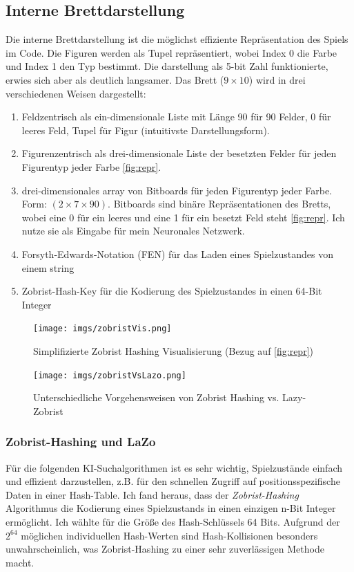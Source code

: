 \documentclass{jpp}
\begin{document}
\subsection{Interne Brettdarstellung}\label{subsec:interneDarstellung}
Die interne Brettdarstellung ist die möglichst effiziente Repräsentation des Spiels im Code. Die Figuren werden als Tupel repräsentiert, wobei Index 0 die Farbe und Index 1 den Typ bestimmt. Die darstellung als 5-bit Zahl funktionierte, erwies sich aber als deutlich langsamer. Das Brett ($9\times10$) wird in drei verschiedenen Weisen dargestellt:

\begin{enumerate}
\item Feldzentrisch als ein-dimensionale Liste mit Länge 90 für 90 Felder, 0 für leeres Feld, Tupel für Figur (intuitivste Darstellungsform).
\item Figurenzentrisch als drei-dimensionale Liste der besetzten Felder für jeden Figurentyp jeder Farbe \ref{fig:repr}. 
\item drei-dimensionales array von Bitboards für jeden Figurentyp jeder Farbe. Form: $(2\times7\times90)$. Bitboards sind binäre Repräsentationen des Bretts, wobei eine 0 für ein leeres 
und eine 1 für ein besetzt Feld steht \ref{fig:repr}. Ich nutze sie als Eingabe für mein Neuronales Netzwerk.
\item Forsyth-Edwards-Notation (FEN) für das Laden eines Spielzustandes von einem string
\item Zobrist-Hash-Key für die Kodierung des Spielzustandes in einen 64-Bit Integer
\end{enumerate}

\begin{figure}
    \centering
    \begin{minipage}{0.44\textwidth}
      \texttt{[image: imgs/zobristVis.png]}
      \caption{Simplifizierte Zobrist Hashing Visualisierung (Bezug auf \ref{fig:repr})}
      \label{fig:zobristHashing}
    \end{minipage}
    \hfill
    \begin{minipage}{0.55\textwidth}
      \texttt{[image: imgs/zobristVsLazo.png]}
      \caption{Unterschiedliche Vorgehensweisen von Zobrist Hashing vs. Lazy-Zobrist}
      \label{fig:zobristVis}
    \end{minipage}
  \end{figure}
  
\subsubsection{Zobrist-Hashing und LaZo}
Für die folgenden KI-Suchalgorithmen ist es sehr wichtig, Spielzustände einfach und effizient darzustellen, z.B. für den schnellen Zugriff auf positionsspezifische Daten in einer Hash-Table. Ich fand heraus, dass der \textit{Zobrist-Hashing} Algorithmus die Kodierung eines Spielzustands in einen einzigen n-Bit Integer ermöglicht. Ich wählte für die Größe des Hash-Schlüssels 64 Bits.
Aufgrund der  $2^{64}$ möglichen individuellen Hash-Werten sind Hash-Kollisionen besonders unwahrscheinlich, was Zobrist-Hashing zu einer sehr zuverlässigen Methode macht.
\end{document}
